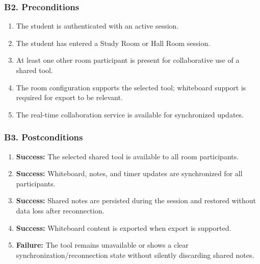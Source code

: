 \documentclass[12pt]{article}
\begin{document}
\hypertarget{sec:b2-preconditions}{}
\subsubsection*{B2. Preconditions}
\par\medskip

\begin{enumerate}
\item The student is authenticated with an active session.
\item The student has entered a Study Room or Hall Room session.
\item At least one other room participant is present for collaborative use of a shared tool.
\item The room configuration supports the selected tool; whiteboard support is required for export to be relevant.
\item The real-time collaboration service is available for synchronized updates.
\end{enumerate}
\par\medskip

\hypertarget{sec:b3-postconditions}{}
\subsubsection*{B3. Postconditions}
\par\medskip

\begin{enumerate}
\item \textbf{Success:} The selected shared tool is available to all room participants.
\item \textbf{Success:} Whiteboard, notes, and timer updates are synchronized for all participants.
\item \textbf{Success:} Shared notes are persisted during the session and restored without data loss after reconnection.
\item \textbf{Success:} Whiteboard content is exported when export is supported.
\item \textbf{Failure:} The tool remains unavailable or shows a clear synchronization/reconnection state without silently discarding shared notes.
\end{enumerate}
\par\medskip

\hypertarget{sec:b4-main-success-scenario-basic-flow}{}
\end{document}
